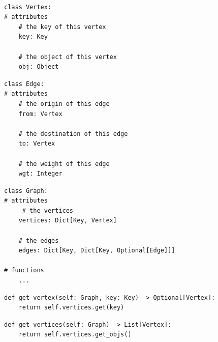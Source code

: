 \documentclass[mathserif, handout]{beamer}
\begin{document}
\begin{frame}[fragile]
	\begin{thmboxtop}
		 \\
		\begin{lstlisting}[style=mypython]
class Vertex:
# attributes
    # the key of this vertex
    key: Key

    # the object of this vertex
    obj: Object
\end{lstlisting}
	\end{thmboxtop}
\end{frame}

\begin{frame}[fragile]
	\begin{thmboxside}
		\begin{lstlisting}[style=mypython, firstnumber=last]
class Edge:
# attributes
    # the origin of this edge
    from: Vertex

    # the destination of this edge
    to: Vertex
    
    # the weight of this edge
    wgt: Integer
\end{lstlisting}
	\end{thmboxside}
\end{frame}

\begin{frame}[fragile]
	\begin{thmboxbot}
		\begin{lstlisting}[style=mypython, firstnumber=last]
class Graph:
# attributes
     # the vertices
    vertices: Dict[Key, Vertex]
    
    # the edges
    edges: Dict[Key, Dict[Key, Optional[Edge]]]

# functions
    ...
\end{lstlisting}
	\end{thmboxbot}
\end{frame}

\begin{frame}[fragile]
	\begin{proofbox}
		\begin{lstlisting}[style=mypython]
def get_vertex(self: Graph, key: Key) -> Optional[Vertex]:
    return self.vertices.get(key)
\end{lstlisting}
	\end{proofbox}
\end{frame}

\begin{frame}[fragile]
	\begin{proofbox}
		\begin{lstlisting}[style=mypython]
def get_vertices(self: Graph) -> List[Vertex]:
    return self.vertices.get_objs()
\end{lstlisting}
	\end{proofbox}
\end{frame}
\end{document}
